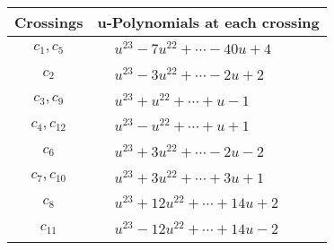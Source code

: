 \documentclass[1p]{elsarticle_modified}
\theoremstyle{definition}
\begin{document}
\begin{tabular}{m{50pt}|m{274pt}}
Crossings & \hspace{64pt}u-Polynomials at each crossing \\
\hline $$\begin{aligned}c_{1},c_{5}\end{aligned}$$&$\begin{aligned}
&u^{23}-7 u^{22}+\cdots-40 u+4
\end{aligned}$\\
\hline $$\begin{aligned}c_{2}\end{aligned}$$&$\begin{aligned}
&u^{23}-3 u^{22}+\cdots-2 u+2
\end{aligned}$\\
\hline $$\begin{aligned}c_{3},c_{9}\end{aligned}$$&$\begin{aligned}
&u^{23}+u^{22}+\cdots+u-1
\end{aligned}$\\
\hline $$\begin{aligned}c_{4},c_{12}\end{aligned}$$&$\begin{aligned}
&u^{23}- u^{22}+\cdots+u+1
\end{aligned}$\\
\hline $$\begin{aligned}c_{6}\end{aligned}$$&$\begin{aligned}
&u^{23}+3 u^{22}+\cdots-2 u-2
\end{aligned}$\\
\hline $$\begin{aligned}c_{7},c_{10}\end{aligned}$$&$\begin{aligned}
&u^{23}+3 u^{22}+\cdots+3 u+1
\end{aligned}$\\
\hline $$\begin{aligned}c_{8}\end{aligned}$$&$\begin{aligned}
&u^{23}+12 u^{22}+\cdots+14 u+2
\end{aligned}$\\
\hline $$\begin{aligned}c_{11}\end{aligned}$$&$\begin{aligned}
&u^{23}-12 u^{22}+\cdots+14 u-2
\end{aligned}$\\
\hline
\end{tabular}\\~\\
\end{document}
